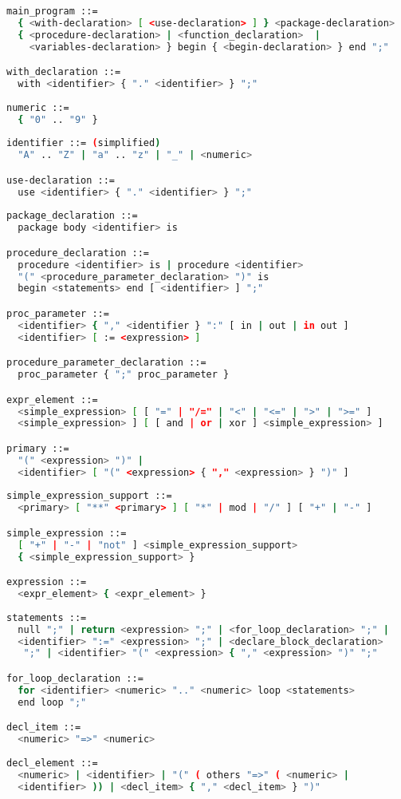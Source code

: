 \documentclass{acmtrans2m}
\begin{document}
\begin{lstlisting}[language=bash,caption=Supported syntax in DARXplorer]
main_program ::=
  { <with-declaration> [ <use-declaration> ] } <package-declaration>
  { <procedure-declaration> | <function_declaration>  | 
    <variables-declaration> } begin { <begin-declaration> } end ";"

with_declaration ::= 
  with <identifier> { "." <identifier> } ";"
 
numeric ::=
  { "0" .. "9" }
  
identifier ::= (simplified)
  "A" .. "Z" | "a" .. "z" | "_" | <numeric>

use-declaration ::= 
  use <identifier> { "." <identifier> } ";"
  
package_declaration ::=
  package body <identifier> is

procedure_declaration ::=
  procedure <identifier> is | procedure <identifier> 
  "(" <procedure_parameter_declaration> ")" is
  begin <statements> end [ <identifier> ] ";"

proc_parameter ::=
  <identifier> { "," <identifier } ":" [ in | out | in out ] 
  <identifier> [ := <expression> ]

procedure_parameter_declaration ::= 
  proc_parameter { ";" proc_parameter }

expr_element ::=
  <simple_expression> [ [ "=" | "/=" | "<" | "<=" | ">" | ">=" ] 
  <simple_expression> ] [ [ and | or | xor ] <simple_expression> ]

primary ::=
  "(" <expression> ")" | 
  <identifier> [ "(" <expression> { "," <expression> } ")" ]
  
simple_expression_support ::= 
  <primary> [ "**" <primary> ] [ "*" | mod | "/" ] [ "+" | "-" ]

simple_expression ::=
  [ "+" | "-" | "not" ] <simple_expression_support>
  { <simple_expression_support> }

expression ::=
  <expr_element> { <expr_element> }
  
statements ::=
  null ";" | return <expression> ";" | <for_loop_declaration> ";" | 
  <identifier> ":=" <expression> ";" | <declare_block_declaration>
   ";" | <identifier> "(" <expression> { "," <expression> ")" ";"

for_loop_declaration ::=
  for <identifier> <numeric> ".." <numeric> loop <statements> 
  end loop ";"

decl_item ::=
  <numeric> "=>" <numeric>
  
decl_element ::=
  <numeric> | <identifier> | "(" ( others "=>" ( <numeric> | 
  <identifier> )) | <decl_item> { "," <decl_item> } ")" 


\end{lstlisting}
\end{document}
